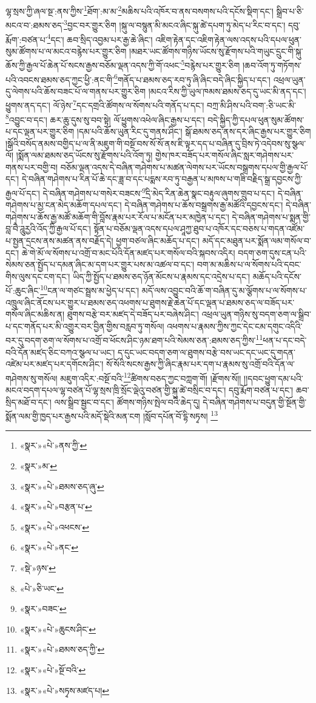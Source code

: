 ལྷ་སྲས་ཀྱི་ཞལ་སྔ་:ནས་ཀྱིས་\footnote{«སྣར་»«པེ་»ནས་ཀྱི་}ཐོག་:མ་མ་\footnote{«སྣར་»མ་}མཆིས་པའི་འཁོར་བ་ནས་བསགས་པའི་དངོས་སྡིག་དང་། སྒྲིབ་པ་ཅི་མངའ་བ་:ཐམས་ཅད་\footnote{«སྣར་»«པེ་»ཐམས་ཅད་ཞུ་}བྱང་བར་གྱུར་ཅིག །སྐུ་ལ་བསྙུན་མི་མངའ་ཞིང་སྐུ་ཚེ་དཔག་ཏུ་མེད་པ་རིང་བ་དང་། དབུ་རྨོག་:བཙན་པ་\footnote{«སྣར་»«པེ་»བརྩན་པ་}དང་། ཆབ་སྲིད་འབྱམ་པར་རྒྱ་ཆེ་ཞིང་། འཇིག་རྟེན་དང་འཇིག་རྟེན་ལས་འདས་པའི་དཔལ་ཕུན་སུམ་ཚོགས་པ་ལ་མངའ་བརྙེས་པར་གྱུར་ཅིག །མཐར་ཡང་ཚོགས་གཉིས་ཡོངས་སུ་རྫོགས་པའི་གཡུང་དྲུང་གི་སྐུ་ཆོས་ཀྱི་རྒྱལ་པོ་ཆེན་པོ་སངས་རྒྱས་བཅོམ་ལྡན་འདས་ཀྱི་གོ་འཕང་\footnote{«སྣར་»«པེ་»འཕངས་}བརྙེས་པར་གྱུར་ཅིག །ཆབ་འོག་ཏུ་གཏོགས་པའི་འབངས་ཐམས་ཅད་ཀྱང་ཕྱི་:ནང་གི་\footnote{«སྣར་»«པེ་»ནང་}གནོད་པ་ཐམས་ཅད་རབ་ཏུ་ཞི་ཞིང་བདེ་ཞིང་སྐྱིད་པ་དང་། འཕྲལ་ཡུན་དུ་ལེགས་པའི་ཆོས་བཟང་པོ་ལ་གནས་པར་གྱུར་ཅིག །མངའ་རིས་ཀྱི་ཡུལ་ཁམས་ཐམས་ཅད་དུ་ཡང་མི་ནད་དང་། ཕྱུགས་ནད་དང་། ལོ་ཉེས་\footnote{«སྡེ་»ཉས་}དང་དགྲའི་ཚོགས་ལ་སོགས་པའི་གནོད་པ་དང་། བཀྲ་མི་ཤིས་པའི་བག་:ཅི་ཡང་མི་\footnote{«པེ་»ཅི་ཡང་}འབྱུང་བ་དང་། ཆར་ཆུ་དུས་སུ་བབ་སྟེ། ལོ་ཕྱུགས་འཕེལ་ཞིང་རྒྱས་པ་དང་། བདེ་སྐྱིད་ཀྱི་དཔལ་ཕུན་སུམ་ཚོགས་པ་དང་ལྡན་པར་གྱུར་ཅིག །དམ་པའི་ཆོས་ཡུན་རིང་དུ་གནས་ཤིང་། སྒོ་ཐམས་ཅད་ནས་དར་ཞིང་རྒྱས་པར་གྱུར་ཅིག །སྒོའི་བསོད་ནམས་བགྱིད་པ་ལ་ནི་མཇུག་གི་བསྔོ་བས་སོ་སོ་ནས་ཇི་ལྟར་དད་པ་བཞིན་དུ་བྲིས་ཏེ་འདེབས་སུ་སྩལ་ལོ། །སྨོན་ལམ་ཐམས་ཅད་ཡོངས་སུ་རྫོགས་པའི་འོག་ཏུ། གྱེས་ཁར་བཟོད་པར་གསོལ་ཞིང་སླར་གཤེགས་པར་གནས་པར་བགྱི་བ། བཅོམ་ལྡན་འདས་དེ་བཞིན་གཤེགས་པ་མཚན་ལེགས་པར་ཡོངས་བསྒྲགས་དཔལ་གྱི་རྒྱལ་པོ་དང་། དེ་བཞིན་གཤེགས་པ་རིན་པོ་ཆེ་དང་ཟླ་བ་དང་པདྨས་རབ་ཏུ་བརྒྱན་པ་མཁས་པ་གཟི་བརྗིད་སྒྲ་དབྱངས་ཀྱི་རྒྱལ་པོ་དང་། དེ་བཞིན་གཤེགས་པ་གསེར་བཟངས་\footnote{«སྣར་»བཟང་}དྲི་མེད་རིན་ཆེན་སྣང་བརྟུལ་ཞུགས་གྲུབ་པ་དང་། དེ་བཞིན་གཤེགས་པ་མྱ་ངན་མེད་མཆོག་དཔལ་དང་། དེ་བཞིན་གཤེགས་པ་ཆོས་བསྒྲགས་རྒྱ་མཚོའི་དབྱངས་དང་། དེ་བཞིན་གཤེགས་པ་ཆོས་རྒྱ་མཚོ་མཆོག་གི་བློས་རྣམ་པར་རོལ་པ་མངོན་པར་མཁྱེན་པ་དང་། དེ་བཞིན་གཤེགས་པ་སྨན་གྱི་བླ་བཻ་ཌཱུརྱའི་འོད་ཀྱི་རྒྱལ་པོ་དང་། སྟོན་པ་བཅོམ་ལྡན་འདས་དཔལ་ཤཱཀྱ་ཐུབ་པ་འཁོར་དང་བཅས་པ་གདན་འཛོམ་པ་སྤྱན་དྲངས་ནས་མཚན་ནས་བརྗོད་དེ། ཕྱག་བཙལ་ཞིང་མཆོད་པ་དང་། མདོ་དང་མཐུན་པར་སྨོན་ལམ་གསོལ་བ་དང་། ཆེ་གེ་མོ་ལ་སོགས་པ་འགྲོ་བ་མང་པོའི་དོན་མཛད་པར་གསོལ་བའི་སྐབས་འདིར། བདག་ཅག་དུས་ངན་པའི་སེམས་ཅན་སྤྱོད་པ་དམན་ཞིང་མ་དག་པར་གྱུར་པས་མ་འཚལ་བ་དང་། བག་མ་མཆིས་པ་ལ་སོགས་པའི་དབང་གིས་ལུས་དང་ངག་དང་། ཡིད་ཀྱི་སྤྱོད་པ་ཐམས་ཅད་ཉོན་མོངས་པ་རྣམས་དང་འདྲེས་པ་དང་། མཆོད་པའི་དངོས་པོ་:ཆུང་ཞིང་\footnote{«སྣར་»«པེ་»ཆུངས་ཤིང་}ངན་ལ་གཙང་སྦྲས་མ་ཕྱེད་པ་དང་། མདོ་ལས་འབྱུང་བའི་ཆོ་ག་བཞིན་དུ་མ་ལྕོགས་པ་ལ་སོགས་པ་འཁྲུལ་ཞིང་ནོངས་པར་གྱུར་པ་ཐམས་ཅད་འཕགས་པ་ཐུགས་རྗེ་ཆེན་པོ་དང་ལྡན་པ་ཐམས་ཅད་ལ་བཟོད་པར་གསོལ་ཞིང་མཆིས་ན། ཐུགས་བརྩེ་བར་མཛད་དེ་བཟོད་པར་བཞེས་ཤིང་། འཕྲལ་ཡུན་གཉིས་སུ་བདག་ཅག་ལ་སྒྲིབ་པ་དང་གནོད་པར་མི་འགྱུར་བར་བྱིན་གྱིས་བརླབ་ཏུ་གསོལ། འཕགས་པ་རྣམས་ཀྱིས་ཀྱང་དེང་ངམ་དགུང་འདིའི་བར་དུ་བདག་ཅག་ལ་སོགས་པ་འགྲོ་བ་ཕོངས་ཤིང་ཉམ་ཐག་པའི་སེམས་ཅན་:ཐམས་ཅད་ཀྱིས་\footnote{«སྣར་»«པེ་»ཐམས་ཅད་ཀྱི་}ཕན་པ་དང་བདེ་བའི་དོན་མཛད་ཅིང་བཀའ་སྩལ་པ་ཡང་། ད་དུང་ཡང་བདག་ཅག་ལ་ཐུགས་བརྩེ་བས་ཡང་དང་ཡང་དུ་གདན་འཛེམ་པར་མཛད་པར་དགོངས་ཤིང་། སོ་སོའི་སངས་རྒྱས་ཀྱི་ཞིང་རྣམ་པར་དག་པ་རྣམས་སུ་འགྲོ་བའི་དོན་ལ་གཤེགས་སུ་གསོལ། མཇུག་འདིར་:བསྔོ་བའི་\footnote{«སྣར་»«པེ་»སྔོ་བའི་}ཚིགས་བཅད་ཀྱང་བཀླག་གོ། །རྫོགས་སོ།། །།དབང་ཕྱུག་དམ་པའི་མངའ་བདག་དཔལ་ལྷ་བཙན་པོ་ལྷ་སྲས་ཁྲི་སྲོང་ལྡེའུ་བཙན་གྱི་སྐུ་ཚེ་བསྲིང་བ་དང་། དབུ་རྨོག་བཙན་པ་དང་། ཆབ་སྲིད་མཐོ་བ་དང་། ལས་སྒྲིབ་སྦྱང་བ་དང་། ཚོགས་གཉིས་སྤེལ་བའི་ཆེད་དུ། དེ་བཞིན་གཤེགས་པ་བདུན་གྱི་སྔོན་གྱི་སྨོན་ལམ་གྱི་ཁྱད་པར་རྒྱས་པའི་མདོ་སྡེའི་མན་ངག །སློབ་དཔོན་བོ་དྷི་སཏྭས། \footnote{«སྣར་»«པེ་»སཏྭས་མཛད་པ། }